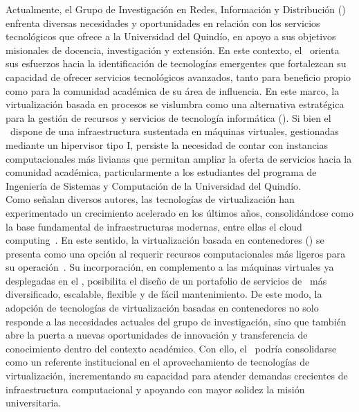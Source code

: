 \label{cap:justificacion}
Actualmente, el Grupo de Investigación en Redes, Información y Distribución 
(\GRID) enfrenta diversas necesidades y oportunidades en relación con los servicios 
tecnológicos que ofrece a la Universidad del Quindío, en apoyo a sus objetivos 
misionales de docencia, investigación y extensión. En este contexto, el \GRID\ 
orienta sus esfuerzos hacia la identificación de tecnologías emergentes que fortalezcan 
su capacidad de ofrecer servicios tecnológicos avanzados, tanto para beneficio propio 
como para la comunidad académica de su área de influencia. En este marco, la virtualización basada en procesos se vislumbra como una alternativa 
estratégica para la gestión de recursos y servicios de tecnología informática 
(\TI). Si bien el \GRID\ dispone de una infraestructura sustentada en máquinas virtuales, 
gestionadas mediante un hipervisor tipo I, persiste la necesidad de contar con instancias 
computacionales más livianas que permitan ampliar la oferta de servicios hacia la comunidad 
académica, particularmente a los estudiantes del programa de Ingeniería de Sistemas y 
Computación de la Universidad del Quindío.\\
Como señalan diversos autores, las tecnologías de virtualización han experimentado un 
crecimiento acelerado en los últimos años, consolidándose como la base fundamental de 
infraestructuras modernas, entre ellas el cloud computing~\citep{Sepulveda-Rodriguez2022}. 
En este sentido, la virtualización basada en contenedores (\VBC) se presenta como una opción 
al requerir recursos computacionales más ligeros para su operación~\citep{Xavier2013}. 
Su incorporación, en complemento a las máquinas virtuales ya desplegadas en el \GRID, 
posibilita el diseño de un portafolio de servicios de \TI\ más diversificado, escalable, 
flexible y de fácil mantenimiento. De este modo, la adopción de tecnologías de virtualización basadas en contenedores no solo 
responde a las necesidades actuales del grupo de investigación, sino que también abre la 
puerta a nuevas oportunidades de innovación y transferencia de conocimiento dentro del 
contexto académico. Con ello, el \GRID\ podría consolidarse como un referente institucional 
en el aprovechamiento de tecnologías de virtualización, incrementando su capacidad para 
atender demandas crecientes de infraestructura computacional y apoyando con mayor solidez 
la misión universitaria.